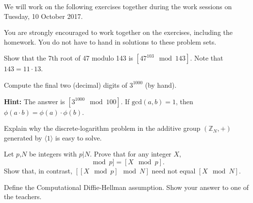 \documentclass[a4paper,10pt,landscape,twocolumn]{scrartcl}
\newcommand\worksession{Tuesday, 10 October 2017}
\begin{document}
\problems

{\sffamily\noindent
We will work on the following exercises together during the work sessions on \worksession.

You are strongly encouraged to work together on the exercises, including the homework. You do not have to hand in solutions to these problem sets.}


\begin{exercise}
Show that the 7th root of 47 modulo 143 is $[47^{103} \mod 143]$. Note that $143=11\cdot 13$.
\end{exercise}

\begin{exercise}
Compute the final two (decimal) digits of $3^{1000}$ (by hand).

\textbf{Hint:} The answer is $[3^{1000} \mod 100]$. If $\text{gcd}(a,b)=1$, then $\phi(a\cdot b)=\phi(a)\cdot\phi(b)$.
\end{exercise}


\begin{exercise}
Explain why the discrete-logarithm problem in the additive group $(\mathbb{Z}_N, +)$ generated by $\langle 1\rangle$ is easy to solve.
\end{exercise}

\begin{exercise}
Let $p$,$N$ be integers with $p|N$. Prove that for any integer $X$,
\begin{equation}
[[X \mod N]\mod p]=[X \mod p].
\end{equation}
Show that, in contrast, $[[X \mod p]\mod N]$ need not equal $[X\mod N]$.
\end{exercise}

\begin{exercise}
Define the Computational Diffie-Hellman assumption.
Show your answer to one of the teachers.
\end{exercise}
\end{document}
